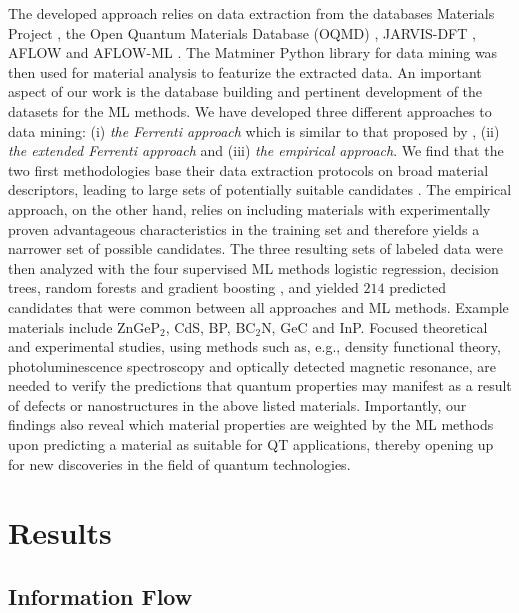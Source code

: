 \documentclass[superscriptaddress,unsortedaddress,
 amsmath,amssymb,
 aps,
]{revtex4-2}
\begin{document}
The developed approach relies on data extraction from the databases Materials Project \cite{Jain2013,Jain2018}, the Open Quantum Materials Database (OQMD) \cite{Saal2013, Kirklin2015}, JARVIS-DFT \cite{Choudhary2020}, AFLOW \cite{Curtarolo2012, Curtarolo2012a, Calderon2015} and AFLOW-ML \cite{Isayev2017}. 
The Matminer Python library for data mining \cite{Ward2018} was then used for material analysis to featurize the extracted data. An important aspect of our work is the database building and pertinent development of the datasets for the ML methods. We have developed three different approaches to data mining: (i) \emph{the Ferrenti approach} which is similar to that proposed by \citeauthor{Ferrenti2020} \cite{Ferrenti2020}, (ii) \emph{the extended Ferrenti approach} and (iii) \emph{the empirical approach}. We find that the two first methodologies base their data extraction protocols on broad material descriptors, leading to large sets of potentially suitable candidates \cite{Mehta2019,Hastie2009}. The empirical approach, on the other hand, relies on including materials with experimentally proven advantageous characteristics in the training set and therefore yields a narrower set of possible candidates. The three resulting sets of labeled data were then analyzed with the four supervised ML methods logistic regression, decision trees, random forests and gradient boosting \cite{Hastie2009,Murphy2012}, and yielded $214$ predicted candidates that were common between all approaches and ML methods.  
Example materials include ZnGeP$_2$, CdS, BP, BC$_2$N, GeC and InP. Focused theoretical and experimental studies, using methods such as, e.g., density functional theory, photoluminescence spectroscopy and optically detected magnetic resonance, are needed to verify the predictions that quantum properties may manifest as a result of defects or nanostructures in the above listed materials. 
Importantly, our findings also reveal which material properties are weighted by the ML methods upon predicting a material as suitable for QT applications, thereby opening up for new  discoveries in the field of quantum technologies. 


\section*{Results}

\subsection*{Information Flow} 
\end{document}

